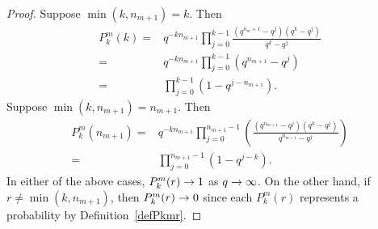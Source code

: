 \begin{proof}
  Suppose $\min(k,n_{m+1}) = k$. Then 
  \begin{align*} 
    P^m_k(k) =& q^{-kn_{m+1}}\prod_{j=0}^{k-1} \frac{(q^{n_m+1}-q^j) (q^k - q^j)}{q^k - q^j}  \\
    =& q^{-kn_{m+1}} \prod_{j=0}^{k-1}(q^{n_{m+1}} - q^j) \\
    =& \prod_{j=0}^{k-1} (1-q^{j-n_{m+1}}).
  \end{align*}
  Suppose $\min(k,n_{m+1}) = n_{m+1}$. Then
  \begin{align*}
    P^m_k(n_{m+1}) 
    =& q^{-kn_{m+1}}\prod_{j=0}^{n_{m+1}-1} \left(\frac{(q^{n_{m+1}} - q^j)(q^k - q^j)}{q^{n_{m+1}} - q^j}  \right)  \\
    =&  \prod_{j=0}^{n_{m+1}-1}(1-q^{j-k}).
	\end{align*}
    In either of the above cases, $P^m_k(r) \rightarrow 1$ as $q \rightarrow \infty$. On the other hand, 
    if $r \neq \min(k,n_{m+1})$, then $P^m_k(r) \rightarrow 0$ since each $P^m_k(r)$ represents
    a probability by Definition~\ref{defPkmr}.
\end{proof}
